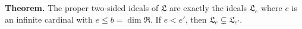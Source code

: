 \textbf{Theorem.} The proper two-sided ideals of $\mathfrak{L}$ are exactly the ideals $\mathfrak{L}_e$ where $e$ is an infinite cardinal with $e \leq b = \dim \mathfrak{R}$. If $e < e'$, then $\mathfrak{L}_e \subsetneq \mathfrak{L}_{e'}$.
